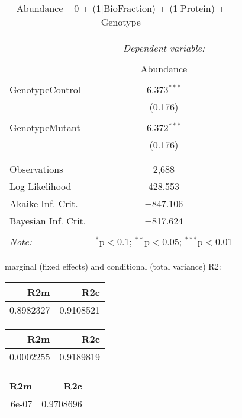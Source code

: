 \documentclass[11pt]{report}
\begin{document}
\begin{table}[!htbp] \centering 
  \caption{Abundance ~ 0 + (1|BioFraction) + (1|Protein) + Genotype} 
  \label{} 
\begin{tabular}{@{\extracolsep{5pt}}lc} 
\\[-1.8ex]\hline 
\hline \\[-1.8ex] 
 & \multicolumn{1}{c}{\textit{Dependent variable:}} \\ 
\cline{2-2} 
\\[-1.8ex] & Abundance \\ 
\hline \\[-1.8ex] 
 GenotypeControl & 6.373$^{***}$ \\ 
  & (0.176) \\ 
  & \\ 
 GenotypeMutant & 6.372$^{***}$ \\ 
  & (0.176) \\ 
  & \\ 
\hline \\[-1.8ex] 
Observations & 2,688 \\ 
Log Likelihood & 428.553 \\ 
Akaike Inf. Crit. & $-$847.106 \\ 
Bayesian Inf. Crit. & $-$817.624 \\ 
\hline 
\hline \\[-1.8ex] 
\textit{Note:}  & \multicolumn{1}{r}{$^{*}$p$<$0.1; $^{**}$p$<$0.05; $^{***}$p$<$0.01} \\ 
\end{tabular} 
\end{table} 
marginal (fixed effects) and conditional (total variance) R2:

\begin{tabular}{r|r}
\hline
R2m & R2c\\
\hline
0.8982327 & 0.9108521\\
\hline
\end{tabular}

\begin{tabular}{r|r}
\hline
R2m & R2c\\
\hline
0.0002255 & 0.9189819\\
\hline
\end{tabular}

\begin{tabular}{r|r}
\hline
R2m & R2c\\
\hline
6e-07 & 0.9708696\\
\hline
\end{tabular}
\end{document}
